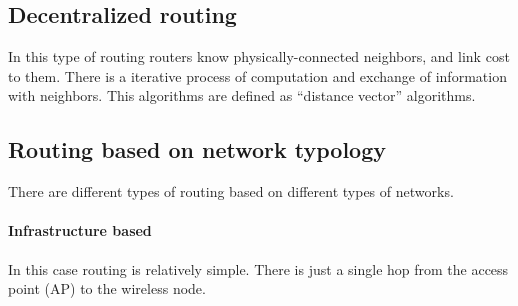 \subsection{Decentralized routing}
In this type of routing routers know physically-connected neighbors, and link
cost to them. There is a iterative process of computation and exchange of
information with neighbors.
This algorithms are defined as ``distance vector'' algorithms.

\subsection{Routing based on network typology}

There are different types of routing based on different types of networks.

\paragraph*{Infrastructure based} In this case routing is relatively simple.
There is just a single hop from the access point (AP) to the wireless node.

